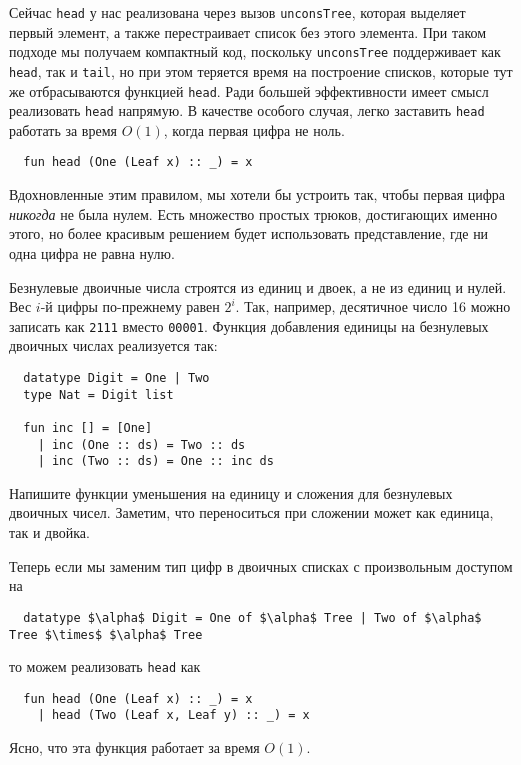 Сейчас \lstinline!head! у нас реализована через вызов
\lstinline!unconsTree!, которая выделяет первый элемент, а также
перестраивает список без этого элемента. При таком подходе мы получаем
компактный код, поскольку \lstinline!unconsTree! поддерживает как
\lstinline!head!, так и \lstinline!tail!, но при этом теряется время
на построение списков, которые тут же отбрасываются функцией
\lstinline!head!. Ради большей эффективности имеет смысл реализовать
\lstinline!head! напрямую. В качестве особого случая, легко заставить
\lstinline!head! работать за время $O(1)$, когда первая цифра не ноль.
\begin{lstlisting}
  fun head (One (Leaf x) :: _) = x
\end{lstlisting}
Вдохновленные этим правилом, мы хотели бы устроить так, чтобы первая
цифра \emph{никогда} не была нулем. Есть множество простых трюков,
достигающих именно этого, но более красивым решением будет
использовать  представление, где ни одна
цифра не равна нулю.

Безнулевые двоичные числа строятся из единиц и двоек, а не из единиц и
нулей. Вес $i$-й цифры по-прежнему равен $2^i$. Так, например,
десятичное число 16 можно записать как \texttt{2111} вместо
\texttt{00001}. Функция добавления единицы на безнулевых двоичных
числах реализуется так:
\begin{lstlisting}
  datatype Digit = One | Two
  type Nat = Digit list

  fun inc [] = [One]
    | inc (One :: ds) = Two :: ds
    | inc (Two :: ds) = One :: inc ds
\end{lstlisting}

\begin{exercise}\label{ex:9.4}
  Напишите функции уменьшения на единицу и сложения для безнулевых
  двоичных чисел. Заметим, что переноситься при сложении может как
  единица, так и двойка.
\end{exercise}

Теперь если мы заменим тип цифр в двоичных списках с произвольным
доступом на
\begin{lstlisting}
  datatype $\alpha$ Digit = One of $\alpha$ Tree | Two of $\alpha$ Tree $\times$ $\alpha$ Tree
\end{lstlisting}
то можем реализовать \lstinline!head! как
\begin{lstlisting}
  fun head (One (Leaf x) :: _) = x
    | head (Two (Leaf x, Leaf y) :: _) = x
\end{lstlisting}
Ясно, что эта функция работает за время $O(1)$.

